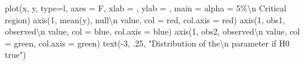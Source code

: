 \documentclass[
  letterpaper,
  DIV=11,
  numbers=noendperiod]{scrreprt}
\newenvironment{Shaded}{\begin{snugshade}}{\end{snugshade}}
\newcommand{\AttributeTok}[1]{\textcolor[rgb]{0.40,0.45,0.13}{#1}}
\newcommand{\DecValTok}[1]{\textcolor[rgb]{0.68,0.00,0.00}{#1}}
\newcommand{\FunctionTok}[1]{\textcolor[rgb]{0.28,0.35,0.67}{#1}}
\newcommand{\NormalTok}[1]{\textcolor[rgb]{0.00,0.23,0.31}{#1}}
\newcommand{\SpecialCharTok}[1]{\textcolor[rgb]{0.37,0.37,0.37}{#1}}
\newcommand{\StringTok}[1]{\textcolor[rgb]{0.13,0.47,0.30}{#1}}
\begin{document}
\begin{Shaded}
\begin{Highlighting}[]
\FunctionTok{plot}\NormalTok{(x, y, }\AttributeTok{type=}\StringTok{\textquotesingle{}l\textquotesingle{}}\NormalTok{, }\AttributeTok{axes =}\NormalTok{ F, }\AttributeTok{xlab =} \StringTok{\textquotesingle{}\textquotesingle{}}\NormalTok{, }\AttributeTok{ylab =} \StringTok{\textquotesingle{}\textquotesingle{}}\NormalTok{,}
     \AttributeTok{main =} \StringTok{\textquotesingle{}alpha = 5\%}\SpecialCharTok{\textbackslash{}n}\StringTok{ Critical region\textquotesingle{}}\NormalTok{)}
\FunctionTok{axis}\NormalTok{(}\DecValTok{1}\NormalTok{, }\FunctionTok{mean}\NormalTok{(y), }\StringTok{\textquotesingle{}null}\SpecialCharTok{\textbackslash{}n}\StringTok{ value\textquotesingle{}}\NormalTok{, }\AttributeTok{col =} \StringTok{\textquotesingle{}red\textquotesingle{}}\NormalTok{, }\AttributeTok{col.axis =} \StringTok{\textquotesingle{}red\textquotesingle{}}\NormalTok{)}
\FunctionTok{axis}\NormalTok{(}\DecValTok{1}\NormalTok{, obs1, }\StringTok{\textquotesingle{}observed}\SpecialCharTok{\textbackslash{}n}\StringTok{ value\textquotesingle{}}\NormalTok{, }\AttributeTok{col =} \StringTok{\textquotesingle{}blue\textquotesingle{}}\NormalTok{, }\AttributeTok{col.axis =} \StringTok{\textquotesingle{}blue\textquotesingle{}}\NormalTok{)}
\FunctionTok{axis}\NormalTok{(}\DecValTok{1}\NormalTok{, obs2, }\StringTok{\textquotesingle{}observed}\SpecialCharTok{\textbackslash{}n}\StringTok{ value\textquotesingle{}}\NormalTok{, }\AttributeTok{col =} \StringTok{\textquotesingle{}green\textquotesingle{}}\NormalTok{, }\AttributeTok{col.axis =} \StringTok{\textquotesingle{}green\textquotesingle{}}\NormalTok{)}
\FunctionTok{text}\NormalTok{(}\SpecialCharTok{{-}}\DecValTok{3}\NormalTok{, .}\DecValTok{25}\NormalTok{, }\StringTok{"Distribution of the}\SpecialCharTok{\textbackslash{}n}\StringTok{ parameter if H0 true"}\NormalTok{)}


\end{Highlighting}
\end{Shaded}
\end{document}
